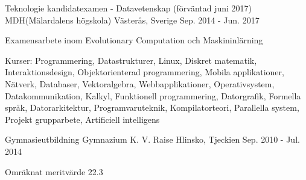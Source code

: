 

\begin{cventries}

    \cventry
      {Teknologie kandidatexamen - Datavetenskap (förväntad juni 2017) } %
      {MDH(Mälardalens högskola)} %
      {Västerås, Sverige} %
      {Sep. 2014 - Jun. 2017} %
      {
        \begin{cvitems} %
          \item {Examensarbete inom Evolutionary Computation och Maskininlärning}
          \item {Kurser: Programmering, Datastrukturer, Linux, Diskret matematik, Interaktionsdesign, Objektorienterad programmering, Mobila applikationer, Nätverk, Databaser, Vektoralgebra, Webbapplikationer, Operativsystem, Datakommunikation, Kalkyl, Funktionell programmering, Datorgrafik, Formella språk, Datorarkitektur, Programvaruteknik, Kompilatorteori, Parallella system, Projekt grupparbete, Artificiell intelligens}
        \end{cvitems}
      }

      \cventry
        { Gymnasieutbildning } %
        {Gymnazium K. V. Raise} %
        {Hlinsko, Tjeckien} %
        {Sep. 2010 - Jul. 2014} %
        {
          \begin{cvitems} %
            \item {Omräknat meritvärde 22.3}
          \end{cvitems}
        }



\end{cventries}
